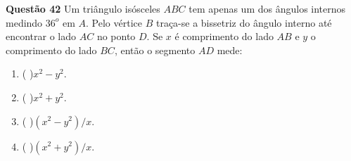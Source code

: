 {\bf Questão 42} 
Um triângulo isósceles $ABC$ tem apenas um dos ângulos internos medindo $36^o$ em $A$. Pelo vértice $B$ traça-se a bissetriz do ângulo interno até encontrar o lado $AC$ no ponto $D$. Se $x$ é comprimento do lado $AB$ e $y$ o comprimento
do lado $BC$, então o segmento $AD$ mede:

\begin{multicols}{2}
\begin{enumerate}
		\item ( )$ x^2- y^2$.
		\item ( )$ x^2+ y^2$.
		\item ( )$ (x^2- y^2)/x$.
		\item ( )$ (x^2+ y^2)/x$.
		\end{enumerate}
\end{multicols}
